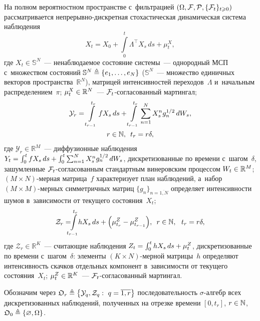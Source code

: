 \begin{multicols}{2}
 На полном вероятностном пространстве с~фильт\-ра\-ци\-ей 
$(\Omega,{\mathcal F},{\mathcal P},\{{\mathcal F}_t\}_{t \geqslant 0})$ рас\-смат\-ри\-ва\-ет\-ся не\-пре\-рыв\-но-дис\-крет\-ная сто\-ха\-сти\-че\-ская
 динамическая сис\-те\-ма наблюдения
\begin{equation}
  X_t =X_0 + \int\limits_0^t \Lambda^{\top}X_{s}\,ds + \mu_t^X,
 \label{eq:stat_1}
 \end{equation}
где
   $X_t \in \mathbb{S}^N$~--- ненаблюдаемое со\-сто\-яние сис\-те\-мы~--- однородный МСП 
  с~множеством со\-сто\-яний $ \mathbb{S}^N \hm\ebd \{e_1,\ldots,e_N\}$ ($\mathbb{S}^N$~--- 
множество единичных век\-то\-ров про\-стран\-ст\-ва~$\mathbb{R}^N$), мат\-ри\-цей 
интенсивностей переходов~$\Lambda$ и~начальным распределением~$\pi$;
  $\mu_t^X \hm\in \mathbb{R}^N$~--- ${\mathcal F}_t$-со\-гла\-со\-ван\-ный мартингал;
 \begin{multline}
  \mathcal{Y}_r = \int\limits_{t_{r-1}}^{t_r}fX_s\,ds+\int\limits_{t_{r-1}}^{t_r} 
\sum\limits_{n=1}^NX_s^ng_n^{{1}/{2}}\, dW_s, \\
r \in \mathbb{N}, \enskip t_r = r \delta, 
 \label{eq:cobs_1}
\end{multline}
где
  $ \mathcal{Y}_r \in \mathbb{R}^M$~--- диффузионные наблюдения
  $Y_t \hm= \int\nolimits_{0}^{t}fX_s\,ds\hm+\int\nolimits_{0}^{t} \sum\nolimits_{n=1}^NX_s^ng_n^{{1}/{2}}\,dW_s$,
   дискретизованные по времени с~шагом~$\delta$,
за\-шум\-лен\-ные ${\mathcal F}_t$-со\-гла\-со\-ван\-ным стандартным винеровским процессом $W_t \hm\in 
\mathbb{R}^M$;  $(M \times N)$-мер\-ная мат\-ри\-ца~$f$ характеризует план 
наблюдений, а~набор $(M\times M)$-мер\-ных сим\-мет\-рич\-ных мат\-риц
  $\{g_n\}_{n=\overline{1,N}}$ определяет интенсивности шумов в~за\-ви\-си\-мости от 
текущего со\-сто\-яния~$X_t$;
\begin{equation}
\mathcal{Z}_r =\!\!\!\!\int\limits_{t_{r-1}}^{t_r} \! \! hX_s\,ds+\left(\mu_{t_r}^Z- \mu_{t_{r-1}}^Z\right)\!,\enskip
r \in \mathbb{N}, \ \  t_r = r \delta,
 \label{eq:sobs_1}
 \end{equation}
где 
  $ \mathcal{Z}_r \in \mathbb{R}^K$~--- считающие наблюдения
   $Z_t \hm=\int\nolimits_{0}^{t}hX_s\,ds\hm+\mu_{t}^Z$, 
  дискретизованные по времени с~шагом~$\delta$: элементы $(K \times N)$-мер\-ной 
мат\-ри\-цы~$h$ определяют ин\-тен\-сив\-ность скач\-ков отдельных компонент в~за\-ви\-си\-мости 
от текущего со\-сто\-яния~$X_t$; $\mu_t^Z \hm\in \mathbb{R}^K$~---  ${\mathcal F}_t$-со\-гла\-со\-ван\-ный мар\-тин\-гал.
 

  Обозначим через $\mathfrak{O}_r \triangleq \left\{ \mathcal{Y}_q, \mathcal{Z}_q: \   q=\overline{1,r}  \right\}$ 
  по\-сле\-до\-ва\-тель\-ность $\sigma$-ал\-гебр всех дискретизованных наблюдений,
полученных на отрезке времени $[0,t_r]$, $r \hm\in \mathbb{N}$, $\mathfrak{O}_0 \hm \ebd \{\varnothing,\Omega\}$.



\end{multicols}
